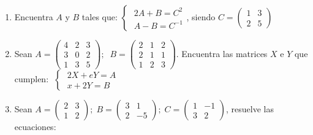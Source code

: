 \begin{enumerate}
\item Encuentra $A$ y $B$ tales que: $\begin{cases} \; 2A+B=C^2\\ \; A-B=C^{-1}  \end{cases}$, siendo $C= \left( \begin{matrix} 1&3\\2&5 \end{matrix} \right)$


\item Sean $A=\left( \begin{matrix} 4&2&3\\3&0&2\\1&3&5 \end{matrix} \right); \; \; B=\left( \begin{matrix} 2&1&2\\2&1&1\\1&2&3 \end{matrix} \right)$. 
 Encuentra las matrices $X$ e $Y$ que cumplen: 
$\; \begin{cases} \; 2X+eY=A\\ \; x+2Y=B  \end{cases}$


\item Sean $A=\left( \begin{matrix} 2&3\\1&2 \end{matrix} \right);\;B=\left( \begin{matrix} 3&1\\2&-5 \end{matrix} \right);\;C=\left( \begin{matrix} 1&-1\\3&2 \end{matrix} \right)$, resuelve las ecuaciones:


\end{enumerate}
